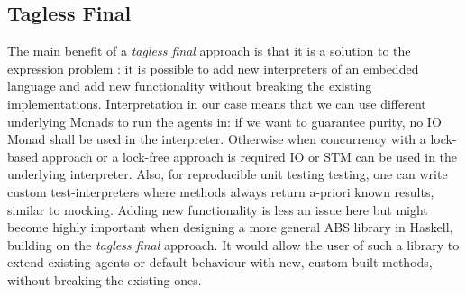 \subsection{Tagless Final}
The main benefit of a \textit{tagless final} approach is that it is a solution to the expression problem \cite{kiselyov_typed_2012}: it is possible to add new interpreters of an embedded language and add new functionality without breaking the existing implementations. Interpretation in our case means that we can use different underlying Monads to run the agents in: if we want to guarantee purity, no IO Monad shall be used in  the interpreter. Otherwise when concurrency with a lock-based approach or a lock-free approach is required IO or STM can be used in the underlying interpreter. Also, for reproducible unit testing testing, one can write custom test-interpreters where methods always return a-priori known results, similar to mocking.
Adding new functionality is less an issue here but might become highly important when designing a more general ABS library in Haskell, building on the \textit{tagless final} approach. It would allow the user of such a library to extend existing agents or default behaviour with new, custom-built methods, without breaking the existing ones.